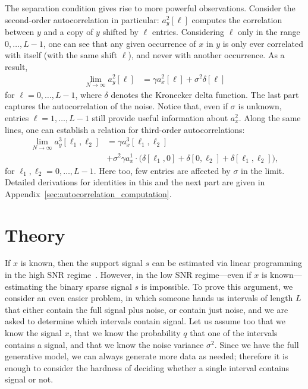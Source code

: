 \documentclass[9pt,twocolumn,twoside,lineno]{pnas-new}
\begin{document}
The separation condition gives rise to more powerful observations. Consider the second-order autocorrelation in particular: $a_y^2[\ell]$ computes the correlation between $y$ and a copy of $y$ shifted by $\ell$ entries. Considering $\ell$ only in the range $0, \ldots, L-1$, one can see that any given occurrence of $x$ in $y$ is only ever correlated with itself (with the same shift $\ell$), and never with another occurrence. As a result,
\begin{align} \label{eq:ac2_micrograph}
\lim_{N\to\infty} a_y^2[\ell] & = \gamma a_{x}^2[\ell] + \sigma^2\delta[\ell]
\end{align}
for $\ell = 0, \ldots, L-1$, where $\delta$ denotes the Kronecker delta function. The last part captures the autocorrelation of the noise. Notice that, even if $\sigma$ is unknown, entries $\ell = 1, \ldots, L-1$ still provide useful information about $a_x^2$.
Along the same lines, one can establish a relation for third-order autocorrelations:
\begin{align} \label{eq:ac3_micrograph}
\lim_{N\to\infty} a_y^3[\ell_1,\ell_2] & = \gamma a_{x}^3[\ell_1,\ell_2] \\& + \sigma^2\gamma a_{x}^1 \cdot \big(\delta[\ell_1,0]+\delta[0,\ell_2]+\delta[\ell_1,\ell_2]\big), 
 \nonumber
\end{align}
for $\ell_1,\ell_2 = 0, \ldots, L-1$. Here too, few entries are affected by $\sigma$ in the limit.
Detailed derivations for identities in this and the next part are given in Appendix~\ref{sec:autocorrelation_computation}.



\section{Theory} \label{sec:theory}

If $x$ is known, then the support signal $s$ can be estimated via linear programming  in the high SNR regime~\cite{azais2015spike,denoyelle2017support,bendory2016robust,bendory2017robust}. 
However, in the low SNR regime---even if $x$ is known---estimating the binary sparse signal $s$ is impossible. 
To prove this argument, we consider an even easier problem, in which someone hands us intervals of length $L$ that either contain the full signal plus noise, or contain just noise, and we are asked to determine which intervals contain signal. 
Let us assume too that we know the signal $x$, that we know the probability $q$ that one of the intervals contains a signal, and that we know the noise variance $\sigma^2$. Since we have the full generative model, we can always generate more data as needed; therefore it is enough to consider the hardness of deciding whether a single interval contains signal or not.
\end{document}
